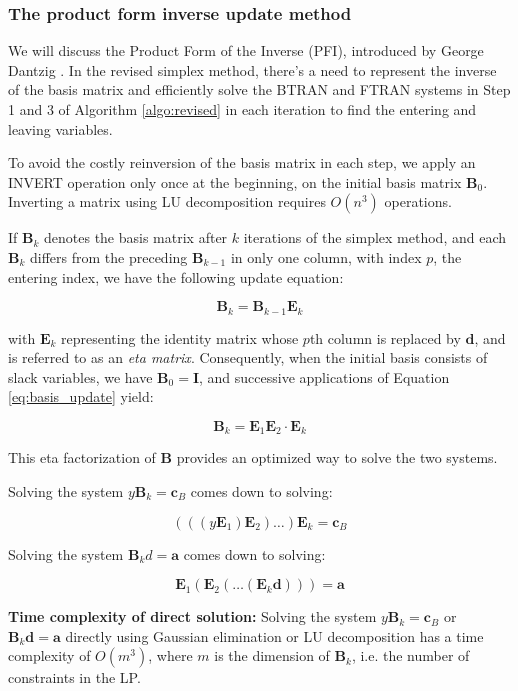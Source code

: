 \subsubsection{The product form inverse update method}

We will discuss the Product Form of the Inverse (PFI), introduced by
George Dantzig \parencite{dantzig1954product}. In the revised simplex method,
there's a need to represent the inverse of the basis matrix and efficiently
solve the BTRAN and FTRAN systems in Step 1 and 3 of Algorithm \ref{algo:revised}
in each iteration to find the entering and leaving variables.

To avoid the costly reinversion of the basis matrix in each step,
we apply an INVERT operation only once at the beginning, on the initial basis
matrix \(\mathbf{B}_0\). Inverting a matrix using LU decomposition requires \(O(n^3)\)
operations.

If \(\mathbf{B}_k\) denotes the basis matrix after \(k\)
iterations of the simplex method, and each \(\mathbf{B}_k\) differs from the
preceding \(\mathbf{B}_{k-1}\) in only one column, with index $p$, the entering index,
we have the following update equation:

\[
    \mathbf{B}_k = \mathbf{B}_{k-1}\mathbf{E}_k \label{eq:basis_update}
\]

with \(\mathbf{E}_k\) representing the identity matrix whose \(p\)th column
is replaced by \(\mathbf{d}\), and is referred to as an \textit{eta matrix}.
Consequently, when the initial basis consists of slack variables,
we have \(\mathbf{B}_0 = \mathbf{I}\), and successive applications of
Equation \ref{eq:basis_update} yield:

\[
    \mathbf{B}_k = \mathbf{E}_1\mathbf{E}_2 \cdot \mathbf{E}_k \label{eq:eta_factorization}
\]

This eta factorization of \(\mathbf{B}\) provides an optimized way
to solve the two systems.

Solving the system \(y\mathbf{B}_k = \mathbf{c}_B\) comes down to solving:

\[
    (((y\mathbf{E}_1)\mathbf{E}_2) \ldots )\mathbf{E}_{k} = \mathbf{c}_B
\]

Solving the system \(\mathbf{B}_kd = \mathbf{a}\) comes down to solving:

\[
    \mathbf{E}_1(\mathbf{E}_2( \ldots (\mathbf{E}_{k}\mathbf{d}))) = \mathbf{a}
\]

\textbf{Time complexity of direct solution:}
Solving the system \(y\mathbf{B}_k = \mathbf{c}_B\) or \(\mathbf{B}_k\mathbf{d} = \mathbf{a}\) directly using
Gaussian elimination or LU decomposition has a time complexity of \(O(m^3)\),
where \(m\) is the dimension of \(\mathbf{B}_k\), i.e. the number of constraints in the LP.


